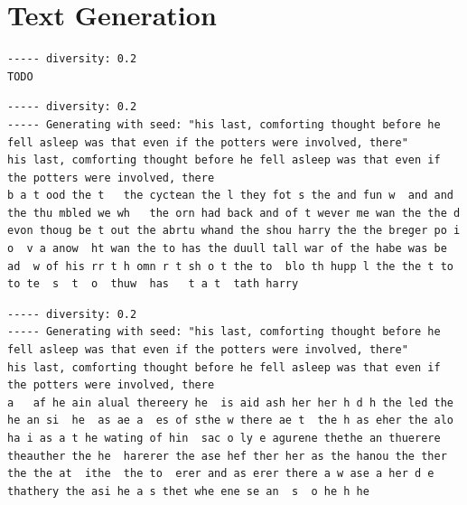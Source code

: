 \documentclass{article}[]
\begin{document}
\appendix
\section{Text Generation}
\begin{lstlisting}[label=nietzsche-low-diverse, caption={Nietzsche after 60 epochs}]
----- diversity: 0.2
TODO
\end{lstlisting}

\begin{lstlisting}[label=lstm-harry-all-low-diverse, caption={LSTM Harry Potter after 60 epochs, diversity=0.2}]
----- diversity: 0.2
----- Generating with seed: "his last, comforting thought before he fell asleep was that even if the potters were involved, there"
his last, comforting thought before he fell asleep was that even if the potters were involved, there
b a t ood the t   the cyctean the l they fot s the and fun w  and and the thu mbled we wh   the orn had back and of t wever me wan the the d evon thoug be t out the abrtu whand the shou harry the the breger po i o  v a anow  ht wan the to has the duull tall war of the habe was be ad  w of his rr t h omn r t sh o t the to  blo th hupp l the the t to to te  s  t  o  thuw  has   t a t  tath harry
\end{lstlisting}

\begin{lstlisting}[label=gru-harry-all-low-diverse, caption={GRU Harry Potter after 60 epochs, diversity=0.2}]
----- diversity: 0.2
----- Generating with seed: "his last, comforting thought before he fell asleep was that even if the potters were involved, there"
his last, comforting thought before he fell asleep was that even if the potters were involved, there
a   af he ain alual thereery he  is aid ash her her h d h the led the he an si  he  as ae a  es of sthe w there ae t  the h as eher the alo ha i as a t he wating of hin  sac o ly e agurene thethe an thuerere theauther the he  harerer the ase hef ther her as the hanou the ther the the at  ithe  the to  erer and as erer there a w ase a her d e thathery the asi he a s thet whe ene se an  s  o he h he
\end{lstlisting}
\end{document}
